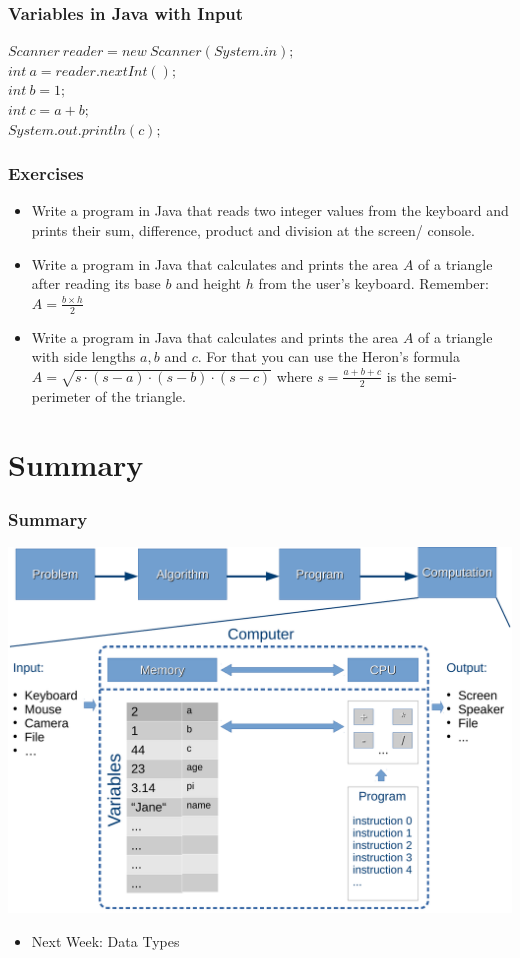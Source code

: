 \documentclass{beamer}
\begin{document}
	\begin{frame}
		\frametitle{Variables in Java with Input}
		$Scanner\ reader = new\ Scanner(System.in);$\\
		$int\ a =reader.nextInt();$\\
		$int\ b = 1;$\\
		$int\ c = a + b;$\\
		$System.out.println(c);$
	\end{frame}

	\begin{frame}
		\frametitle{Exercises}
		\begin{itemize}
			\item Write a program in Java that reads two integer values from the keyboard and prints their sum, difference, product and division at the screen/ console.
			\pause
			\item Write a program in Java that calculates and prints the area $A$ of a triangle after reading its base $b$ and height $h$ from the user's keyboard. Remember: $A = \frac{b \times h}{2}$
			\pause
			\item Write a program in Java that calculates and prints the area $A$ of a triangle with side lengths $a, b$ and $c$. For that you can use the Heron's formula $A = \sqrt{s \cdot (s-a) \cdot (s-b) \cdot (s-c)}$ where $s = \frac{a+b+c}{2}$ is the semi-perimeter of the triangle.
		\end{itemize}
	\end{frame}

	
	\section{Summary}

	\begin{frame}
		\frametitle{Summary}
		\centering
		\includegraphics[width=.7\textwidth]{Memory-CPU-Scheme}
		\begin{itemize}
			\item Next Week: Data Types
		\end{itemize}
	\end{frame}
\end{document}

